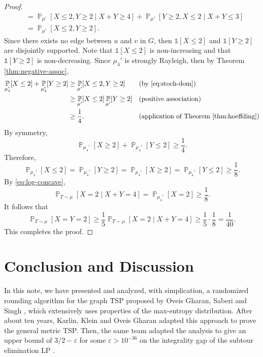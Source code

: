 \documentclass[letterpaper, reqno,12pt]{article}
\newcommand{\PP}{\mathop{{}\mathbb{P}}}
\begin{document}
\begin{proof}
\begin{align}
    &= \PP_{\mu'}[X \leq 2, Y \geq 2 \mid X + Y \geq 4] + \PP_{\mu'}[Y \geq 2, X \leq 2 \mid X + Y \leq 3] \nonumber \\
    &= \PP_{\mu'}[X \leq 2, Y \geq 2]. \label{eq:stoch-dom}
  \end{align}
  Since there exists no edge between $u$ and $v$ in $G$, then $\mathds 1[X \leq 2]$ and $\mathds 1[Y \geq 2]$ are disjointly supported. Note that $\mathds 1[X \leq 2]$ is non-increasing and that $\mathds 1[Y \geq 2]$ is non-decreasing. Since $\mu_4'$ is strongly Rayleigh, then by Theorem \ref{thm:negative-assoc},
  \begin{align*}
    \PP_{\mu_4'}[X \leq 2] + \PP_{\mu_4'}[Y \geq 2] &\geq \PP_{\mu'}[X \leq 2, Y \geq 2] && \text{(by \eqref{eq:stoch-dom})} \\
    &\geq \PP_{\mu'}[X \leq 2] \PP_{\mu'}[Y \geq 2] && \text{(positive association)} \\
    &\geq \frac{1}{4}. && \text{(application of Theorem \ref{thm:hoeffding})}
  \end{align*}
  By symmetry,
  $$ \PP_{\mu_4'}[X \geq 2] + \PP_{\mu_4'}[Y \leq 2] \geq \frac{1}{4}. $$
  Therefore,
  $$ \PP_{\mu_4'}[X \leq 2] = \PP_{\mu_4'}[Y \geq 2] = \PP_{\mu_4'}[X \geq 2] = \PP_{\mu_4'}[Y \leq 2] \geq \frac{1}{8}. $$
  By \eqref{eq:log-concave},
  $$ \PP_{T \sim \mu}[X = 2 \mid X + Y = 4] = \PP_{\mu_4'}[X = 2] \geq \frac{1}{8}. $$
  It follows that
  $$ \PP_{T \sim \mu}[X = Y = 2] \geq \frac{1}{5} \PP_{T \sim \mu}[X = 2 \mid X + Y = 4] \geq \frac{1}{5} \cdot \frac{1}{8} = \frac{1}{40}. $$
  This completes the proof.
\end{proof}

\section{Conclusion and Discussion}

In this note, we have presented and analyzed, with simplication, a randomized rounding algorithm for the graph TSP proposed by Oveis Gharan, Saberi and Singh \cite{gharan2011randomized}, which extensively uses properties of the max-entropy distribution. After about ten years, Karlin, Klein and Oveis Gharan \cite{karlin2021slightly} adapted this approach to prove the general metric TSP. Then, the same team adapted the analysis to give an upper bound of $3/2 - \varepsilon$ for some $\varepsilon > 10^{-36}$ on the integrality gap of the subtour elimination LP \cite{karlin2021slightlyig}.
\end{document}
